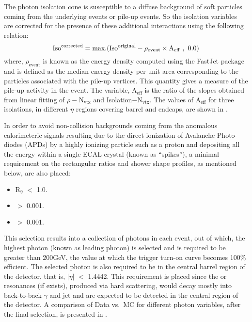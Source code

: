 The photon isolation cone is susceptible to a diffuse background of soft particles coming from the underlying events or pile-up events. 
So the isolation variables are corrected for the presence of these additional interactions using the following relation:
\begin{equation}
  \textrm{Iso}^{\textrm{corrected}} = \textrm{max.}(\textrm{Iso}^{\textrm{original}} - \rho_{\textrm{event}} \times \textrm{A}_{\textrm{eff}}\hspace{0.05in},\hspace{0.05in} 0.0)
\end{equation}
where, $\rho_{\textrm{event}}$ is known as the energy density computed using the FastJet package~\cite{Cacciari2011ma} and is defined as the median
energy density per unit area corresponding to the particles associated with the pile-up vertices. This quantity gives a measure of the pile-up activity in the
event. The variable, $\textrm{A}_{\textrm{eff}}$ is the ratio of the slopes obtained from linear fitting of $\rho-\textrm{N}_{\textrm{vtx}}$ and
Isolation$-\textrm{N}_{\textrm{vtx}}$. The values of $\textrm{A}_{\textrm{eff}}$ for three isolations, in different $\eta$ regions covering barrel and endcaps,
are shown in \tab{\ref{Table:photonAeff}}.



In order to avoid non-collision backgrounds coming from the anomalous calorimeteric signals resulting due to the direct ionization of Avalanche Photo-diodes (APDs)
by a highly ionizing particle such as a proton and depositing all the energy within a single ECAL crystal (known as ``spikes''), a minimal requirement
on the rectangular ratios and shower shape profiles, as mentioned below, are also placed:
\begin{itemize}[leftmargin=*]
\item R$_{9}$ $<$ 1.0.
\item \sigmaIetaIeta $>$ 0.001.
\item \sigmaIphiIphi $>$ 0.001.
\end{itemize}

This selection results into a collection of photons in each event, out of which, the highest \pt photon (known as leading photon) is selected and is required
to be greater than 200\unit{GeV}, the \pt value at which the trigger turn-on curve becomes 100$\%$ efficient. The selected photon is also required to be in the
central barrel region of the detector, that is, $|{\eta}|$ $<$ 1.4442. This requirement is placed since the \qstar or \bstar resonances (if exists), produced
via hard scattering, would decay mostly into back-to-back $\gamma$ and jet and are expected to be detected in the central region of the detector.  
A comparison of Data vs.\ MC for different photon variables, after the final selection, is presented in \fig{\ref{fig:PhIdnIso}}.

